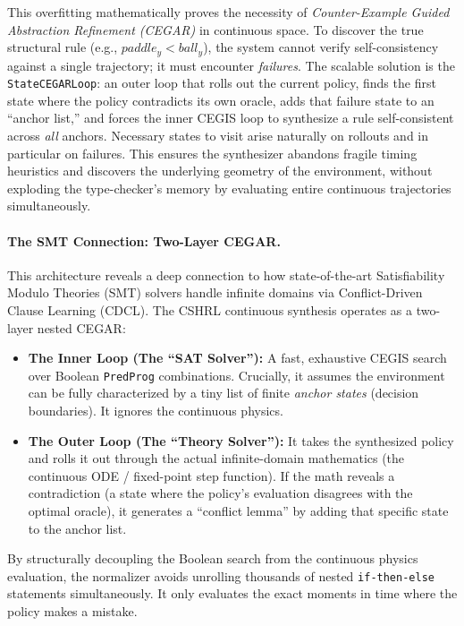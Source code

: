 \documentclass[9pt,a4paper]{article}
\theoremstyle{plain}
\theoremstyle{definition}
\theoremstyle{remark}
\begin{document}
This overfitting mathematically proves the necessity of \emph{Counter-Example Guided Abstraction Refinement (CEGAR)} in continuous space. To discover the true structural rule (e.g., $paddle_y < ball_y$), the system cannot verify self-consistency against a single trajectory; it must encounter \emph{failures}. The scalable solution is the \texttt{StateCEGARLoop}: an outer loop that rolls out the current policy, finds the first state where the policy contradicts its own oracle, adds that failure state to an ``anchor list,'' and forces the inner CEGIS loop to synthesize a rule self-consistent across \emph{all} anchors. Necessary states to visit arise naturally on rollouts and in particular on failures. This ensures the synthesizer abandons fragile timing heuristics and discovers the underlying geometry of the environment, without exploding the type-checker's memory by evaluating entire continuous trajectories simultaneously.

\paragraph{The SMT Connection: Two-Layer CEGAR.}
This architecture reveals a deep connection to how state-of-the-art Satisfiability Modulo Theories (SMT) solvers handle infinite domains via Conflict-Driven Clause Learning (CDCL). The CSHRL continuous synthesis operates as a two-layer nested CEGAR:
\begin{itemize}
    \item \textbf{The Inner Loop (The ``SAT Solver''):} A fast, exhaustive CEGIS search over Boolean \texttt{PredProg} combinations. Crucially, it assumes the environment can be fully characterized by a tiny list of finite \emph{anchor states} (decision boundaries). It ignores the continuous physics.
    \item \textbf{The Outer Loop (The ``Theory Solver''):} It takes the synthesized policy and rolls it out through the actual infinite-domain mathematics (the continuous ODE / fixed-point step function). If the math reveals a contradiction (a state where the policy's evaluation disagrees with the optimal oracle), it generates a ``conflict lemma'' by adding that specific state to the anchor list.
\end{itemize}
By structurally decoupling the Boolean search from the continuous physics evaluation, the normalizer avoids unrolling thousands of nested \texttt{if-then-else} statements simultaneously. It only evaluates the exact moments in time where the policy makes a mistake.
\end{document}
